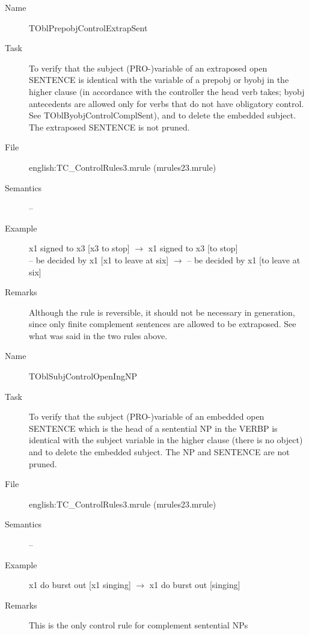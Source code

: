 \begin{description}
\vspace{1 cm}
\begin{description}
\item[Name]   TOblPrepobjControlExtrapSent
\item[Task] To verify that  the subject (PRO-)variable of an extraposed
open SENTENCE is 
identical with the variable of a prepobj or byobj in the higher clause (in 
accordance with 
the controller the head verb takes; byobj antecedents are allowed only for 
verbs that do not have obligatory control. See TOblByobjControlComplSent), 
and to delete the embedded subject. The extraposed SENTENCE is not pruned.
\item[File] english:TC\_ControlRules3.mrule (mrules23.mrule)
\item[Semantics] --
\item[Example] x1 signed to x3 [x3 to stop] $\rightarrow$ x1 signed to x3 
[to stop] \\
-- be decided by x1 [x1 to leave at six] $\rightarrow$ -- be decided by x1 [to 
leave at six]
\item[Remarks] Although the rule is reversible, it should not be necessary in 
generation, since only finite complement sentences are allowed to be 
extraposed. See what was said in the two rules above.
\end{description}

\vspace{1 cm}
\begin{description}
\item[Name]   TOblSubjControlOpenIngNP
\item[Task] To verify that  the subject (PRO-)variable of an embedded 
open SENTENCE which is the head of a sentential NP in the VERBP is 
identical with the subject variable in the higher clause (there is no object)
and to delete the embedded subject. The NP and SENTENCE are not pruned.
\item[File] english:TC\_ControlRules3.mrule (mrules23.mrule)
\item[Semantics] --
\item[Example] x1 do burst out [x1 singing] $\rightarrow$ x1 do burst out 
[singing]
\item[Remarks] This is the only control rule for complement sentential NPs
\end{description}


\end{description}
